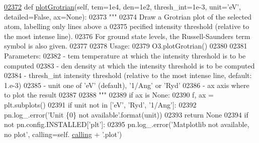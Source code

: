 \begin{DoxyCode}
\hypertarget{classpyneb_1_1core_1_1pynebcore_1_1_atom_l02372}{}\hyperlink{classpyneb_1_1core_1_1pynebcore_1_1_atom_ad18adec8faaf694fbff55656efea719d}{02372}     \textcolor{keyword}{def }\hyperlink{classpyneb_1_1core_1_1pynebcore_1_1_atom_ad18adec8faaf694fbff55656efea719d}{plotGrotrian}(self, tem=1e4, den=1e2, thresh\_int=1e-3, unit='eV', detailed=False, 
      ax=None):
02373         \textcolor{stringliteral}{"""}
02374 \textcolor{stringliteral}{        Draw a Grotrian plot of the selected atom, labelling only lines above a}
02375 \textcolor{stringliteral}{        pecified intensity threshold (relative to the most intense line). }
02376 \textcolor{stringliteral}{        For ground state levels, the Russell-Saunders term symbol is also given.}
02377 \textcolor{stringliteral}{        }
02378 \textcolor{stringliteral}{        Usage:}
02379 \textcolor{stringliteral}{            O3.plotGrotrian()}
02380 \textcolor{stringliteral}{        }
02381 \textcolor{stringliteral}{        Parameters:}
02382 \textcolor{stringliteral}{            - tem          temperature at which the intensity threshold is to be computed }
02383 \textcolor{stringliteral}{            - den          density at which the intensity threshold is to be computed }
02384 \textcolor{stringliteral}{            - thresh\_int   intensity threshold (relative to the most intense line, default: 1.e-3)}
02385 \textcolor{stringliteral}{            - unit         one of 'eV' (default), '1/Ang' or 'Ryd'}
02386 \textcolor{stringliteral}{            - ax           axis where to plot the result}
02387 \textcolor{stringliteral}{}
02388 \textcolor{stringliteral}{        """}
02389         \textcolor{keywordflow}{if} ax \textcolor{keywordflow}{is} \textcolor{keywordtype}{None}:
02390             f, ax = plt.subplots()
02391         \textcolor{keywordflow}{if} unit \textcolor{keywordflow}{not} \textcolor{keywordflow}{in} [\textcolor{stringliteral}{'eV'}, \textcolor{stringliteral}{'Ryd'}, \textcolor{stringliteral}{'1/Ang'}]:
02392             pn.log\_.error(\textcolor{stringliteral}{'Unit \{0\} not available'}.format(unit))
02393             \textcolor{keywordflow}{return} \textcolor{keywordtype}{None}
02394         \textcolor{keywordflow}{if} \textcolor{keywordflow}{not} pn.config.INSTALLED[\textcolor{stringliteral}{'plt'}]: 
02395             pn.log\_.error(\textcolor{stringliteral}{'Matplotlib not available, no plot'}, calling=self.
      \hyperlink{classpyneb_1_1core_1_1pynebcore_1_1_atom_a373b7735acf4f528b54bddf373ad67a1}{calling} + \textcolor{stringliteral}{'.plot'})

\end{DoxyCode}
